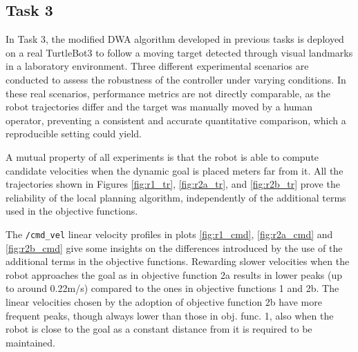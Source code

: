 \subsection{Task 3}


In Task 3, the modified DWA algorithm developed in previous tasks is deployed on a real TurtleBot3 to follow a moving target detected through visual landmarks in a laboratory environment. Three different experimental scenarios are conducted to assess the robustness of the controller under varying conditions. In these real scenarios, performance metrics are not directly comparable, as the robot trajectories differ and the target was manually moved by a human operator, preventing a consistent and accurate quantitative comparison, which a reproducible setting could yield.

A mutual property of all experiments is that the robot is able to compute candidate velocities when the dynamic goal is placed meters far from it. All the trajectories shown in Figures \ref{fig:r1_tr}, \ref{fig:r2a_tr}, and \ref{fig:r2b_tr} prove the reliability of the local planning algorithm, independently of the additional terms used in the objective functions.

The \texttt{/cmd\_vel} linear velocity profiles in plots \ref{fig:r1_cmd}, \ref{fig:r2a_cmd} and \ref{fig:r2b_cmd} give some insights on the differences introduced by the use of the additional terms in the objective functions. Rewarding slower velocities when the robot approaches the goal as in objective function 2a results in lower peaks (up to around 0.22m/s) compared to the ones in objective functions 1 and 2b. The linear velocities chosen by the adoption of objective function 2b have more frequent peaks, though always lower than those in obj. func. 1, also when the robot is close to the goal as a constant distance from it is required to be maintained.

